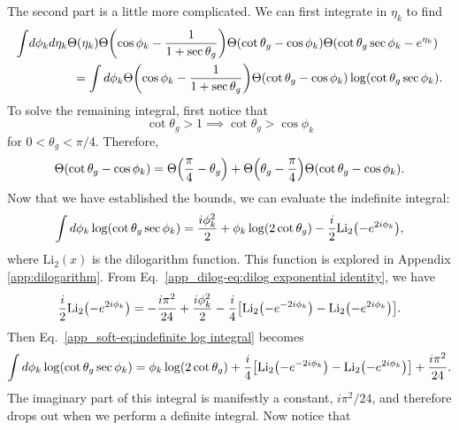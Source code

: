 \documentclass[../thesis.tex]{subfiles}
\providecommand{\Li}{\mathrm{Li}}
\begin{document}
	The second part is a little more complicated. We can first integrate in $\eta_k$ to find
	\begin{equation}\label{app_soft-eq:integral after eta}
	\begin{aligned}
		\int &d\phi_k d\eta_k \Theta(\eta_k)\Theta\qty(\cos\phi_k - \frac{1}{1+\sec\theta_g})\Theta(\cot\theta_g - \cos\phi_k) \Theta\qty(\cot\theta_g\sec\phi_k - e^{\eta_k}) \\
		&\hspace{1.25cm}= \int d\phi_k \Theta\qty(\cos\phi_k - \frac{1}{1+\sec\theta_g})\Theta(\cot\theta_g - \cos\phi_k) \log(\cot\theta_g \sec\phi_k ).
	\end{aligned}
	\end{equation}
	To solve the remaining integral, first notice that
	\begin{equation}
		\cot\theta_g > 1 \implies \cot\theta_g > \cos\phi_k
	\end{equation}
	for $0 < \theta_g < \pi/4$. Therefore,
	\begin{equation}\label{app_soft-eq:pi/4 split}
		\Theta(\cot\theta_g - \cos\phi_k) = \Theta\qty(\frac{\pi}{4} - \theta_g) + \Theta\qty(\theta_g - \frac{\pi}{4})\Theta(\cot\theta_g - \cos\phi_k).
	\end{equation}
	Now that we have established the bounds, we can evaluate the indefinite integral:
	\begin{equation}\label{app_soft-eq:indefinite log integral}
		\int d\phi_k \log(\cot\theta_g \sec\phi_k ) = \frac{i \phi_k^2}{2} + \phi_k \log(2\cot\theta_g) - \frac{i}{2}\Li_2\qty(-e^{2i\phi_k}),
	\end{equation}
	where $\Li_2(x)$ is the dilogarithm function. This function is explored in Appendix \ref{app:dilogarithm}. From Eq.~\ref{app_dilog-eq:dilog exponential identity}, we have
	\begin{equation}
		\frac{i}{2}\Li_2\qty(-e^{2i\phi_k}) = -\frac{i \pi^2}{24} + \frac{i\phi_k^2}{2} - \frac{i}{4}\qty[\Li_2\qty(-e^{-2i\phi_k}) - \Li_2\qty(-e^{2i\phi_k})].
	\end{equation}
	Then Eq.~\ref{app_soft-eq:indefinite log integral} becomes
	\begin{equation}\label{app_soft-eq:indefinite log integral simplified}
		\int d\phi_k \log(\cot\theta_g \sec\phi_k ) = \phi_k \log(2\cot\theta_g) + \frac{i}{4}\qty[\Li_2\qty(-e^{-2i\phi_k}) - \Li_2\qty(-e^{2i\phi_k})] + \frac{i\pi^2}{24}.
	\end{equation}
	The imaginary part of this integral is manifestly a constant, $i\pi^2/24$, and therefore drops out when we perform a definite integral. Now notice that
\end{document}
